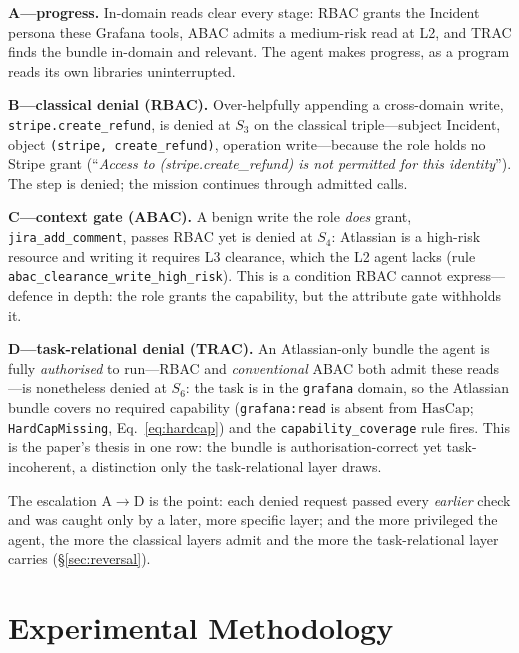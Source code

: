 \documentclass[sigconf,review,anonymous]{acmart}
\begin{document}
\textbf{A---progress.} In-domain reads clear every stage: RBAC grants the Incident persona these Grafana tools, ABAC admits a medium-risk read at L2, and TRAC finds the bundle in-domain and relevant. The agent makes progress, as a program reads its own libraries uninterrupted.

\textbf{B---classical denial (RBAC).} Over-helpfully appending a cross-domain write, \texttt{stripe.create\_refund}, is denied at $S_3$ on the classical triple---subject Incident, object \texttt{(stripe, create\_refund)}, operation write---because the role holds no Stripe grant (``\emph{Access to (stripe.create\_refund) is not permitted for this identity}''). The step is denied; the mission continues through admitted calls.

\textbf{C---context gate (ABAC).} A benign write the role \emph{does} grant, \texttt{jira\_add\_comment}, passes RBAC yet is denied at $S_4$: Atlassian is a high-risk resource and writing it requires L3 clearance, which the L2 agent lacks (rule \texttt{abac\_clearance\_write\_high\_risk}). This is a condition RBAC cannot express---defence in depth: the role grants the capability, but the attribute gate withholds it.

\textbf{D---task-relational denial (TRAC).} An Atlassian-only bundle the agent is fully \emph{authorised} to run---RBAC and \emph{conventional} ABAC both admit these reads---is nonetheless denied at $S_6$: the task is in the \texttt{grafana} domain, so the Atlassian bundle covers no required capability (\texttt{grafana:read} is absent from $\mathrm{HasCap}$; \texttt{HardCapMissing}, Eq.~\ref{eq:hardcap}) and the \texttt{capability\_coverage} rule fires. This is the paper's thesis in one row: the bundle is authorisation-correct yet task-incoherent, a distinction only the task-relational layer draws.

The escalation A$\to$D is the point: each denied request passed every \emph{earlier} check and was caught only by a later, more specific layer; and the more privileged the agent, the more the classical layers admit and the more the task-relational layer carries (\S\ref{sec:reversal}).


\section{Experimental Methodology}
\label{sec:methodology}
\end{document}
